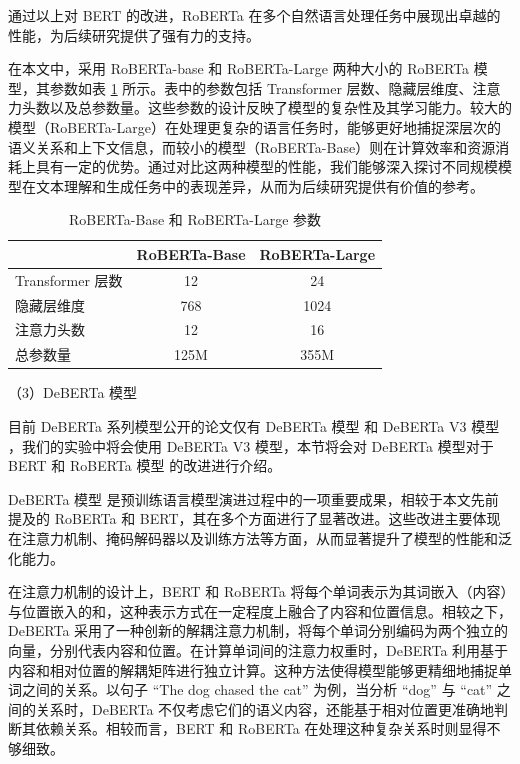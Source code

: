 通过以上对 BERT 的改进，RoBERTa 在多个自然语言处理任务中展现出卓越的性能，为后续研究提供了强有力的支持。

在本文中，采用 RoBERTa-base 和 RoBERTa-Large 两种大小的 RoBERTa 模型，其参数如表 \ref{tab:roberta-parameter} 所示。表中的参数包括 Transformer 层数、隐藏层维度、注意力头数以及总参数量。这些参数的设计反映了模型的复杂性及其学习能力。较大的模型（RoBERTa-Large）在处理更复杂的语言任务时，能够更好地捕捉深层次的语义关系和上下文信息，而较小的模型（RoBERTa-Base）则在计算效率和资源消耗上具有一定的优势。通过对比这两种模型的性能，我们能够深入探讨不同规模模型在文本理解和生成任务中的表现差异，从而为后续研究提供有价值的参考。

\begin{table}[htbp]
\centering
\caption{ RoBERTa-Base 和 RoBERTa-Large 参数} \label{tab:roberta-parameter}
\begin{tabular}{lcc}
\toprule
               & \multicolumn{1}{l}{\textbf{RoBERTa-Base} \cite{liu_roberta_2019}} & \multicolumn{1}{l}{\textbf{RoBERTa-Large} \cite{liu_roberta_2019}} \\ \midrule
Transformer 层数 & 12                                        & 24                                         \\
隐藏层维度          & 768                                       & 1024                                       \\
注意力头数          & 12                                        & 16                                         \\
总参数量           & 125M                                      & 355M                                      \\ \bottomrule
\end{tabular}
\end{table}

（3）DeBERTa 模型
\label{sec:method-pretrain-deberta}

目前 DeBERTa 系列模型公开的论文仅有 DeBERTa 模型 \cite{he_deberta_2021} 和 DeBERTa V3 模型 \cite{he2023debertav3improvingdebertausing}，我们的实验中将会使用 DeBERTa V3 模型，本节将会对 DeBERTa 模型对于 BERT \cite{devlin_bert_2019} 和 RoBERTa 模型 \cite{liu_roberta_2019} 的改进进行介绍。

DeBERTa 模型 \cite{he_deberta_2021} 是预训练语言模型演进过程中的一项重要成果，相较于本文先前提及的 RoBERTa 和 BERT，其在多个方面进行了显著改进。这些改进主要体现在注意力机制、掩码解码器以及训练方法等方面，从而显著提升了模型的性能和泛化能力。

在注意力机制的设计上，BERT 和 RoBERTa 将每个单词表示为其词嵌入（内容）与位置嵌入的和，这种表示方式在一定程度上融合了内容和位置信息。相较之下，DeBERTa 采用了一种创新的解耦注意力机制，将每个单词分别编码为两个独立的向量，分别代表内容和位置。在计算单词间的注意力权重时，DeBERTa 利用基于内容和相对位置的解耦矩阵进行独立计算。这种方法使得模型能够更精细地捕捉单词之间的关系。以句子 “The dog chased the cat” 为例，当分析 “dog” 与 “cat” 之间的关系时，DeBERTa 不仅考虑它们的语义内容，还能基于相对位置更准确地判断其依赖关系。相较而言，BERT 和 RoBERTa 在处理这种复杂关系时则显得不够细致。

